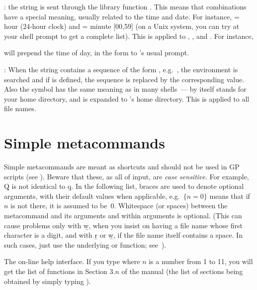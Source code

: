 \item {}: the string is sent through the library
function . This means that \kbd{\%} combinations have
a special meaning, usually related to the time and date. For instance,
 = hour (24-hour clock) and  = minute [00,59] (on a Unix
system, you can try  at your shell prompt to get a complete
list). This is applied to , , and . For
instance,


\noindent
will prepend the time of day, in the form 
to 's usual prompt.

\item {}: When the string contains a sequence of
the form , e.g.~, the environment is
searched and if  is defined, the sequence is replaced by the
corresponding value. Also the \kbd{\til} symbol has the same meaning as in
many shells~--- \kbd{\til} by itself stands for your home directory, and
 is expanded to 's home directory. This is applied
to all file names. \label{se:envir}

\section{Simple metacommands}\label{se:meta}

\noindent
Simple metacommands are meant as shortcuts and should not be used in GP
scripts (see ). Beware that these, as all of 
input, are \emph{case sensitive}. For example, \b{Q} is not identical to
\b{q}. In the following list, braces are used to denote optional arguments,
with their default values when applicable, e.g.~$\{n=0\}$ means that if $n$
is not there, it is assumed to be~$0$. Whitespace (or spaces) between the
metacommand and its arguments and within arguments is optional. (This can
cause problems only with \b{w}, when you insist on having a file name whose
first character is a digit, and with \b{r} or \b{w}, if the file name itself
contains a space. In such cases, just use the underlying  or
 function; see~).

 The  on-line help interface.
If you type  where $n$ is a number from 1 to 11, you will get the
list of functions in Section $3.n$ of the manual (the list of sections being
obtained by simply typing ). \label{se:exthelp}

